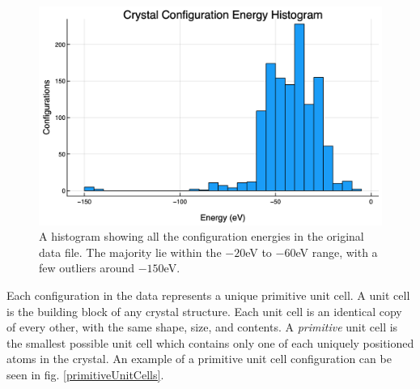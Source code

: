 \begin{figure}%
\centering
\includegraphics[scale = 0.4]{Figures/UnitCellEnergies}
\caption{A histogram showing all the configuration energies in the original data file. The majority lie within the $-20$eV to $-60$eV range, with a few outliers around $-150$eV.
\label{histEnergy}} 
\end{figure}

\par Each configuration in the data represents a unique primitive unit cell. A unit cell is the building block of any crystal structure. Each unit cell is an identical copy of every other, with the same shape, size, and contents. A \textit{primitive} unit cell is the smallest possible unit cell which contains only one of each uniquely positioned atoms in the crystal\cite{solidStateBook}. An example of a primitive unit cell configuration can be seen in fig. \ref{primitiveUnitCells}.

